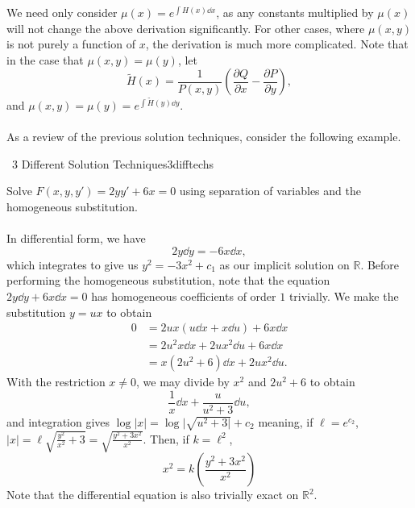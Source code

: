         We need only consider \(\mu(x)=e^{\int H(x)\dd x}\), as any constants multiplied by \(\mu(x)\) will not change the above derivation significantly. For other cases, where \(\mu(x,y)\) is not purely a function of \(x\), the derivation is much more complicated. Note that in the case that \(\mu(x,y)=\mu(y)\), let
        \begin{equation*}
            \tilde{H}(x)=\frac{1}{P(x,y)}\left(\frac{\partial Q}{\partial x}-\frac{\partial P}{\partial y}\right),
        \end{equation*}
        and \(\mu(x,y)=\mu(y)=e^{\int \tilde{H}(y) \dd y}\).
        \pagebreak
        \\
        \\
        As a review of the previous solution techniques, consider the following example.
        \begin{example}{\Difficulty\,\Difficulty\,\,3 Different Solution Techniques}{3difftechs}

            Solve \(F(x,y,y')=2yy'+6x=0\) using separation of variables and the homogeneous substitution.
            \\
            \\
            In differential form, we have
            \begin{equation*}
                2y\dd y=-6x\dd x,
            \end{equation*}
            which integrates to give us \(y^2=-3x^2+c_1\) as our implicit solution on \(\mathbb{R}\). Before performing the homogeneous substitution, note that the equation \(2y\dd y+6x\dd x=0\) has homogeneous coefficients of order \(1\) trivially. We make the substitution \(y=ux\) to obtain
            \begin{align*}
                0&=2ux(u\dd x+x\dd u)+6x\dd x \\
                &=2u^2x\dd x+2ux^2\dd u+6x\dd x \\
                &=x(2u^2+6)\dd x+2ux^2\dd u.
            \end{align*}
            With the restriction \(x\neq0\), we may divide by \(x^2\) and \(2u^2+6\) to obtain
            \begin{equation*}
                \frac{1}{x}\dd x+\frac{u}{u^2+3}\dd u,
            \end{equation*}
            and integration gives \(\log|x|=\log|\sqrt{u^2+3|}+c_2\) meaning, if \(\ell=e^{c_2}\), \(|x|=\ell\sqrt{\frac{y^2}{x^2}+3}=\sqrt{\frac{y^2+3x^2}{x^2}}\). Then, if \(k=\ell^2\),
            \begin{equation*}
                x^2=k\left(\frac{y^2+3x^2}{x^2}\right)
            \end{equation*}
            Note that the differential equation is also trivially exact on \(\mathbb{R}^2\).
            
        \end{example}
